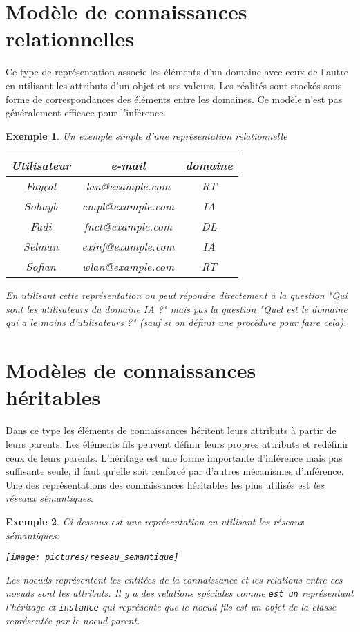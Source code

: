 \documentclass[12pt,a4paper]{report}
\newtheorem{example}{Exemple}
\begin{document}
\section{Modèle de connaissances relationnelles}
Ce type de représentation associe les éléments d'un domaine avec ceux de l'autre en utilisant les attributs d'un objet et
ses valeurs. Les réalités sont stockés sous forme de correspondances des éléments entre les domaines. Ce modèle n'est pas
généralement efficace pour l'inférence.\cite{KRC}
\begin{example}
Un exemple simple d'une représentation relationnelle

\begin{table}[h]
\centering
\begin{tabular}{|c|c|c|}
\hline
Utilisateur & e-mail & domaine \\
\hline
Fayçal & lan@example.com & RT \\
\hline
Sohayb & cmpl@example.com & IA \\
\hline
Fadi & fnct@example.com & DL \\
\hline
Selman & exinf@example.com & IA \\
\hline
Sofian & wlan@example.com & RT \\
\hline
\end{tabular}
\end{table}
En utilisant cette représentation on peut répondre directement à la question "Qui sont les utilisateurs du domaine IA ?"
mais pas la question "Quel est le domaine qui a le moins d'utilisateurs ?" (sauf si on définit une procédure
pour faire cela).
\end{example}

\section{Modèles de connaissances héritables}
Dans ce type les éléments de connaissances héritent leurs attributs à partir de leurs parents. Les éléments fils
peuvent définir leurs propres attributs et redéfinir ceux de leurs parents. L'héritage est une forme importante
d'inférence mais pas suffisante seule, il faut qu'elle soit renforcé par d'autres mécanismes d'inférence.
Une des représentations des connaissances héritables les plus utilisés est \emph{les réseaux sémantiques}.\cite{KRC}

\begin{example}
Ci-dessous est une représentation en utilisant les réseaux sémantiques:

\texttt{[image: pictures/reseau\_semantique]}

Les noeuds représentent les entitées de la connaissance et les relations entre ces noeuds sont les attributs.
Il y a des relations spéciales comme \texttt{est un} représentant l'héritage et \texttt{instance} qui
représente que le noeud fils est un objet de la classe représentée par le noeud parent.
\end{example}
\end{document}

